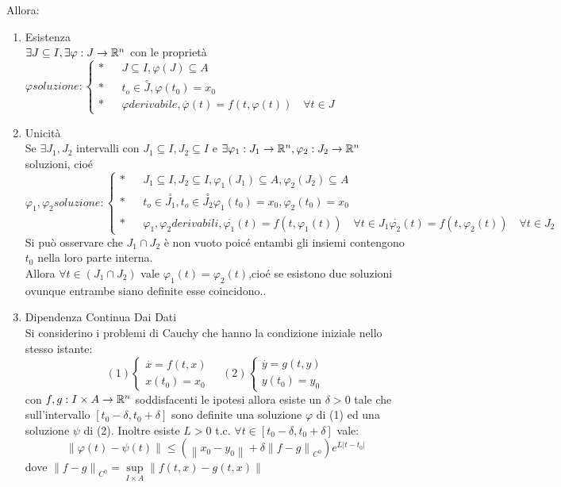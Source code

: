 Allora:
\begin{enumerate}
	\item Esistenza\\
	$\exists J\subseteq I, \exists\varphi : J \to \mathbb{R}^n$ con le proprietà\\
	$\varphi soluzione:
	\left\{
	\begin{matrix}
	\ast && J\subseteq I, \varphi(J)\subseteq{A}\\
	\ast && t_o\in\overset{\circ}{J}, \varphi(t_0)=x_0\\
	\ast && \varphi derivabile, \overset{\cdot}{\varphi}(t)=f(t,\varphi(t)) \quad\forall t\in J\end{matrix}\right.$
	\item Unicità\\
	Se $\exists J_1,J_2$ intervalli con $J_1\subseteq I,J_2\subseteq I$ e $\exists \varphi_1:J_1\to \mathbb{R}^n, \varphi_2:J_2\to \mathbb{R}^n$ soluzioni, cio\'e\\
	$\varphi_1,\varphi_2 soluzione:
	\left\{
	\begin{matrix}
	\ast && J_1\subseteq I,J_2\subseteq I, \varphi_1(J_1)\subseteq{A},\varphi_2(J_2)\subseteq{A}\\
	\ast && t_o\in\overset{\circ}{J_1},t_o\in\overset{\circ}{J_2} \varphi_1(t_0)=x_0, \varphi_2(t_0)=x_0\\
	\ast && \varphi_1,\varphi_2 derivabili, \overset{\cdot}{\varphi_1}(t)=f(t,\varphi_1(t)) \quad\forall t\in J_1
	\overset{\cdot}{\varphi_2}(t)=f(t,\varphi_2(t)) \quad\forall t\in J_2
	\end{matrix}\right.$
	Si può osservare che $J_1\cap J_2$ è non vuoto poic\'e entambi gli insiemi contengono $t_0$ nella loro parte interna.\\
	Allora $\forall t \in(J_1\cap J_2)$ vale $\varphi_1(t)=\varphi_2(t)$,cio\'e se esistono due soluzioni ovunque entrambe siano definite esse coincidono..\\
	\item Dipendenza Continua Dai Dati\\
	Si considerino i problemi di Cauchy che hanno la condizione iniziale nello stesso istante:
	$$ 
	(1)\left\{
	\begin{matrix}
	\overset{\cdot}{x}=f(t,x)\\x(t_0)=x_0
	\end{matrix}
	\right.\quad
	(2)\left\{
	\begin{matrix}
	\overset{\cdot}{y}=g(t,y)\\y(t_0)=y_0
	\end{matrix}
	\right.
	$$
	con $f,g:I\times A \to \mathbb{R}^n$ soddisfacenti le ipotesi allora esiste un $\delta >0$ tale che sull'intervallo $\left[ t_0-\delta,t_0+\delta \right]$ sono definite una soluzione $\varphi$ di (1) ed una soluzione $\psi$ di (2). Inoltre esiste $L>0$ t.c. $\forall t\in \left[t_0-\delta,t_0+\delta\right]$ vale:
	$$ 
	\left\| \varphi(t)-\psi(t) \right\| 
	\le 
	(\left\| x_0-y_0 \right\|+\delta\left\| f-g \right\|_{C^0})e^{L|t-t_0|}  
	$$
	dove $\left\| f-g \right\|_{C^0}=\sup\limits_{I\times A}\left\|f(t,x)-g(t,x)\right\|$
\end{enumerate}
